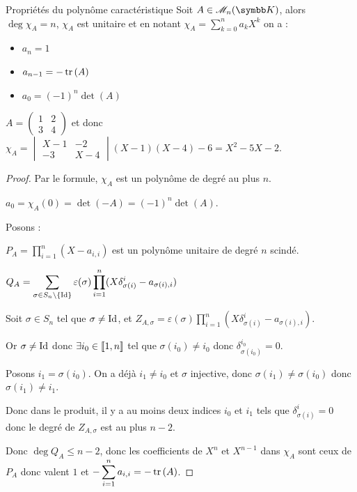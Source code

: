 \begin{theoreme}{Propriétés du polynôme caractéristique}{}
    Soit $A \in \mathscr M_n (\K)$, alors $\deg \chi_A = n$, $\chi_A$ est unitaire et en notant $\displaystyle \chi_A = \sum_{k = 0 }^{n } a_kX^k$ on a : 

    \begin{itemize}
        \item $a_n = 1$
        \item $a_{n - 1} = - \operatorname{tr} \,(A)$
        \item $a_0 = (-1)^n \det(A)$
    \end{itemize}
\end{theoreme}

\begin{exemple}
    $A = \begin{pmatrix}
        1 & 2 \\
        3 & 4
    \end{pmatrix}$ et donc $\chi_A = \begin{vmatrix}
        X - 1 & -2 \\
        -3 & X - 4
    \end{vmatrix} (X - 1)(X - 4) - 6 = X^2 - 5X - 2$.
\end{exemple}


\begin{proof}
    Par le formule, $\chi_A$ est un polynôme de degré au plus $n$.

    $a_0 = \chi_A(0) = \det(-A) = (-1)^n \det(A)$.

    \avspace Posons : 
    
    $\displaystyle P_A = \prod_{i = 1 }^{ n } (X - a_{i, i})$ est un polynôme unitaire de degré $n$ scindé.

    $\displaystyle Q_A = \sum_{\sigma \in S_n \setminus \{\operatorname{Id}\}} \varepsilon(\sigma) \prod_{i = 1 }^{ n } (X \delta_{\sigma(i)}^i - a_{\sigma(i), i})$ 

    Soit $\sigma \in S_n$ tel que $\sigma \neq \operatorname{Id}$, et 
    $\displaystyle Z_{A, \sigma} = \varepsilon(\sigma) \prod_{i = 1 }^{ n } (X \delta_{\sigma(i)}^i - a_{\sigma(i), i})$.

    Or $\sigma \neq \operatorname{Id}$ donc $\exists i_0 \in [\![1, n]\!]$ tel que $\sigma(i_0) \neq i_0$ donc $\delta_{\sigma(i_0)}^{i_0} = 0$.

    Posons $i_1 = \sigma(i_0)$. On a déjà $i_1 \neq i_0$ et $\sigma$ injective, donc $\sigma(i_1) \neq \sigma(i_0)$
    donc $\sigma(i_1) \neq i_1$. 

    Donc dans le produit, il y a au moins deux indices $i_0$ et $i_1$ tels que 
    $\delta_{\sigma(i)}^i = 0$ donc le degré de $Z_{A, \sigma}$ est au plus $n - 2$.

    Donc $\deg Q_A \leqslant n - 2$, donc les coefficients de $X^n$ et $X^{n - 1}$ dans $\chi_A$ 
    sont ceux de $P_A$ donc valent $1$ et $\displaystyle - \sum_{i = 1 }^{n } a_{i, i} = - \operatorname{tr} \,(A)$.
\end{proof}

